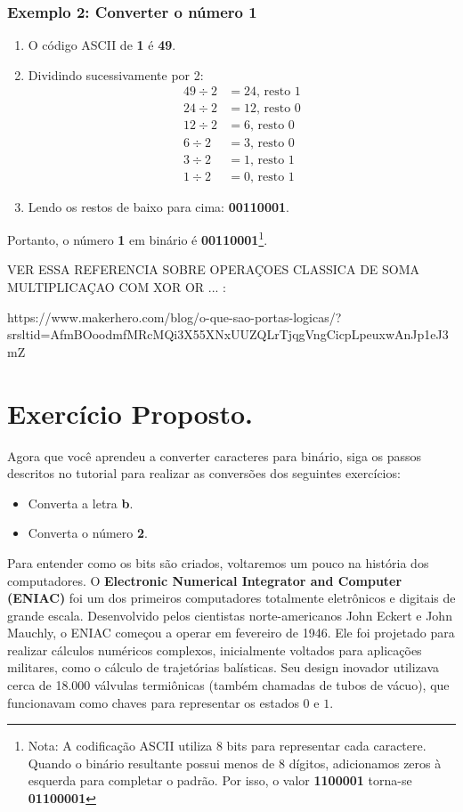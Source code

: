 \subsubsection*{Exemplo 2: Converter o número \textbf{1}}
\begin{enumerate}
    \item O código ASCII de \textbf{1} é \textbf{49}.
    \item Dividindo sucessivamente por 2:
    \begin{align*}
        49 \div 2 &= 24 \text{, resto } 1 \\
        24 \div 2 &= 12 \text{, resto } 0 \\
        12 \div 2 &= 6 \text{, resto } 0 \\
        6 \div 2 &= 3 \text{, resto } 0 \\
        3 \div 2 &= 1 \text{, resto } 1 \\
        1 \div 2 &= 0 \text{, resto } 1
    \end{align*}
    \item Lendo os restos de baixo para cima: \textbf{00110001}.
\end{enumerate}
Portanto, o número \textbf{1} em binário é \textbf{00110001}\footnote{ Nota: A codificação ASCII utiliza 8 bits para representar cada caractere. Quando o binário resultante possui menos de 8 dígitos, adicionamos zeros à esquerda para completar o padrão. Por isso, o valor \textbf{1100001} torna-se \textbf{01100001}}.

VER ESSA REFERENCIA SOBRE OPERAÇOES CLASSICA DE SOMA MULTIPLICAÇAO COM XOR OR ... :

https://www.makerhero.com/blog/o-que-sao-portas-logicas/?srsltid=AfmBOoodmfMRcMQi3X55XNxUUZQLrTjqgVngCicpLpeuxwAnJp1eJ3mZ
\section*{Exercício Proposto.}
Agora que você aprendeu a converter caracteres para binário, siga os passos descritos no tutorial para realizar as conversões dos seguintes exercícios:

\begin{itemize}
    \item Converta a letra \textbf{b}.
    \item Converta o número \textbf{2}.
\end{itemize}

Para entender como os bits são criados, voltaremos um pouco na história dos computadores. O \textbf{Electronic Numerical Integrator and Computer (ENIAC)} foi um dos primeiros computadores totalmente eletrônicos e digitais de grande escala. Desenvolvido pelos cientistas norte-americanos John Eckert e John Mauchly, o ENIAC começou a operar em fevereiro de 1946. Ele foi projetado para realizar cálculos numéricos complexos, inicialmente voltados para aplicações militares, como o cálculo de trajetórias balísticas. Seu design inovador utilizava cerca de 18.000 válvulas termiônicas (também chamadas de tubos de vácuo), que funcionavam como chaves para representar os estados $0$ e $1$. %

